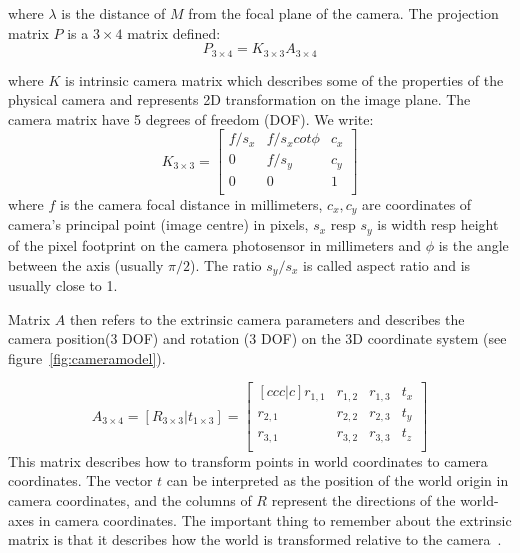 where $\lambda$ is the distance of $M$ from the focal plane of the camera. The projection matrix $P$ is a $3 \times 4$ matrix defined:
\begin{equation}
	P_{3 \times 4}= K_{3 \times 3}A_{3 \times 4}
\end{equation}

where $K$ is intrinsic camera matrix which describes some of the properties of the physical camera and represents 2D transformation on the image plane. The camera matrix have 5 degrees of freedom (DOF). We write:
\begin{equation}
	K_{3 \times 3} = 
	\begin{bmatrix}
		f/s_x & f/s_x  cot \phi & c_x \\
		0 & f/s_y & c_y \\
		0 & 0  & 1 \\
	\end{bmatrix}
\end{equation}
where $f$ is the camera focal distance in millimeters, $c_x, c_y$ are coordinates of camera's principal point (image centre) in pixels, $s_x$ resp $s_y$ is width resp height of the pixel footprint on the camera photosensor in millimeters and $\phi$ is the angle between the axis (usually $\pi /2$). The ratio $s_y/s_x$ is called aspect ratio and is usually close to 1.

Matrix $A$ then refers to the extrinsic camera parameters and describes the camera position(3 DOF) and rotation (3 DOF) on the 3D coordinate system (see figure~\ref{fig:cameramodel}).

\begin{equation}
	A_{3 \times 4} = [R_{3 \times 3} |t_{1 \times 3}] =
	\begin{bmatrix}[ccc|c]
		r_{1,1} & r_{1,2} & r_{1,3} & t_{x} \\
		r_{2,1} & r_{2,2} & r_{2,3} & t_{y} \\
		r_{3,1} & r_{3,2} & r_{3,3} & t_{z} \\
	\end{bmatrix}
\end{equation}
This matrix describes how to transform points in world coordinates to camera coordinates. The vector $t$ can be interpreted as the position of the world origin in camera coordinates, and the columns of $R$ represent the directions of the world-axes in camera coordinates. The important thing to remember about the extrinsic matrix is that it describes how the world is transformed relative to the camera~\cite{www:extrinsic-camera, www:visual-3D-modeling, solem}.

